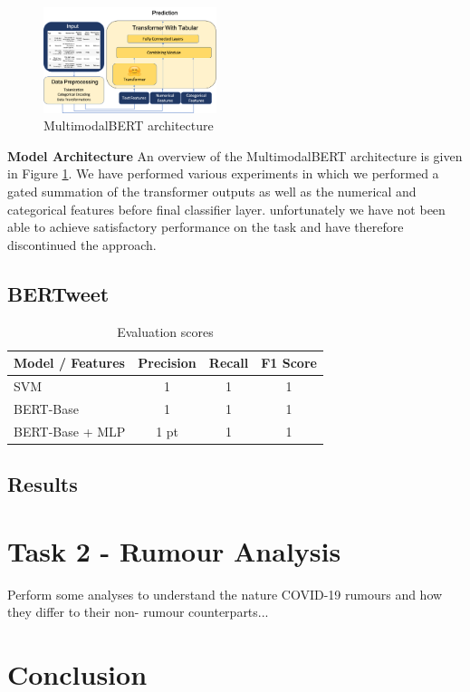 \documentclass[11pt,a4paper]{article}
\begin{document}
\begin{figure}[h]
\centering
\includegraphics[width=0.45\textwidth]{images/multimodal_bert}
\caption{MultimodalBERT architecture}
\label{fig:multimodal_bert_architecture}
\end{figure}
\newline
\newline
\textbf{Model Architecture}
\newline
An overview of the MultimodalBERT architecture is given in Figure \ref{fig:multimodal_bert_architecture}. We have performed various experiments in which we performed a gated summation of the transformer outputs as well as the numerical and categorical features before final classifier layer. unfortunately we have not been able to achieve satisfactory performance on the task and have therefore discontinued the approach.

\subsection{BERTweet}


\begin{table}
\centering
\setlength\tabcolsep{2pt}
\begin{tabular}{lccc}
\hline 
\textbf{Model / Features} & Precision & Recall & F1 Score \\ \hline
SVM & 1 & 1 & 1 \\
BERT-Base & 1 & 1 & 1 \\
BERT-Base + MLP  & 1 pt & 1 & 1 \\
\hline
\end{tabular}
\label{tbl:evaluation_scores} 
\caption{Evaluation scores }
\end{table}

\subsection{Results}

\section{Task 2 - Rumour Analysis}

Perform some analyses to understand the nature COVID-19 rumours and how they differ to their non- rumour counterparts...

\section{Conclusion}





\end{document}
